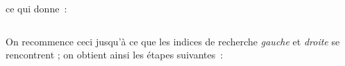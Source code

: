 		\begin{center}
			\tablefirsthead{}
			\tablehead{}
			\tabletail{}
			\tablelasttail{}
			\begin{supertabular}{|m{1.171cm}|m{1.206cm}|m{1.206cm}|m{1.206cm}|m{1.206cm}|m{1.206cm}|m{1.206cm}|m{1.206cm}|m{1.206cm}|m{1.232cm}|}
			\hline
			 &
			 &
			 &
			 &
			 &
			 &
			 &
			 &
			 &
			\centering{}\\\hline
			\end{supertabular}
		\end{center}

		ce qui donne~:

		\begin{center}
			\tablefirsthead{}
			\tablehead{}
			\tabletail{}
			\tablelasttail{}
			\begin{supertabular}{|m{1.171cm}|m{1.206cm}|m{1.206cm}|m{1.206cm}|m{1.206cm}|m{1.206cm}|m{1.206cm}|m{1.206cm}|m{1.206cm}|m{1.232cm}|}
			\hline
			 &
			 &
			 &
			 &
			 &
			 &
			 &
			 &
			 &
			\centering{}\\\hline
			\end{supertabular}
		\end{center}

		On recommence ceci jusqu'à ce que les indices de recherche 
		\textit{gauche} et \textit{droite} se rencontrent ; on
		obtient ainsi les étapes suivantes~:

		\begin{center}
			\tablefirsthead{}
			\tablehead{}
			\tabletail{}
			\tablelasttail{}
			\begin{supertabular}{|m{1.171cm}|m{1.206cm}|m{1.206cm}|m{1.206cm}|m{1.206cm}|m{1.206cm}|m{1.206cm}|m{1.206cm}|m{1.206cm}|m{1.232cm}|}
			\hline
			 &
			 &
			 &
			 &
			 &
			 &
			 &
			 &
			 &
			\centering{}\\\hline
			\end{supertabular}
		\end{center}

